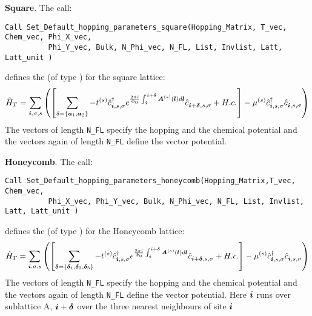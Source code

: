  \noindent
 \textbf{Square}.     The call:
 \begin{lstlisting}[style=fortran]
 Call Set_Default_hopping_parameters_square(Hopping_Matrix, T_vec, Chem_vec, Phi_X_vec,  
          Phi_Y_vec, Bulk, N_Phi_vec, N_FL, List, Invlist, Latt, Latt_unit )
\end{lstlisting}
defines  the   (of type  )    for the square  lattice: 
\begin{equation}
\hat{H}_T  =   \sum_{\boldsymbol{i}, \sigma, s}  \left( \left[ \sum_{ \delta = \left\{ \boldsymbol{a}_1, \boldsymbol{a}_2\right\} }    - t^{(s)} \hat{c}^{\dagger}_{\boldsymbol{i},s,\sigma}   e^{\frac{2 \pi i}{\Phi_0} \int_{\boldsymbol{i}}^{\boldsymbol{i}+ \boldsymbol{\delta}}  \boldsymbol{A}^{(s)}(\boldsymbol{l})  d \boldsymbol{l}}   \hat{c}^{}_{\boldsymbol{i} + \boldsymbol{\delta},s,\sigma} +  H.c.   \right]    -  \mu^{(s)} \hat{c}^{\dagger}_{\boldsymbol{i},s,\sigma} \hat{c}^{}_{\boldsymbol{i},s,\sigma}  \right) 
\end{equation}
The vectors   of  length \texttt{N\_FL}    specify the hopping and the chemical potential   and the  vectors 
  again of  length  \texttt{N\_FL}    define the vector potential. 

\noindent
 \textbf{Honeycomb}.     The call: 
 \begin{lstlisting}[style=fortran]
 Call Set_Default_hopping_parameters_honeycomb(Hopping_Matrix,T_vec, Chem_vec, 
          Phi_X_vec, Phi_Y_vec, Bulk, N_Phi_vec, N_FL, List, Invlist, Latt, Latt_unit )
\end{lstlisting}
defines  the   (of type  )    for the  Honeycomb lattice: 
\begin{equation}
\hat{H}_T  =   \sum_{\boldsymbol{i}, \sigma, s}  \left( \left[ \sum_{ \boldsymbol{\delta} = \left\{ \boldsymbol{\delta}_1, \boldsymbol{\delta}_2, \boldsymbol{\delta}_3\right\} }    - t^{(s)} \hat{c}^{\dagger}_{\boldsymbol{i},s,\sigma}   e^{\frac{2 \pi i}{\Phi_0} \int_{\boldsymbol{i}}^{\boldsymbol{i}+ \boldsymbol{\delta}}  \boldsymbol{A}^{(s)}(\boldsymbol{l})  d \boldsymbol{l}}   \hat{c}^{}_{\boldsymbol{i} + \boldsymbol{\delta},s,\sigma} +  H.c.  \right]      -  \mu^{(s)} \hat{c}^{\dagger}_{\boldsymbol{i},s,\sigma} \hat{c}^{}_{\boldsymbol{i},s,\sigma}  \right) 
\end{equation}
The vectors   of  length \texttt{N\_FL}    specify the hopping and the chemical potential   and the  vectors 
  again of  length  \texttt{N\_FL}    define the vector potential.    Here $\boldsymbol{i}$  runs over  sublattice  A,     
$\boldsymbol{i} + \boldsymbol{\delta}$    over the three nearest neighbours of site $\boldsymbol{i}$



